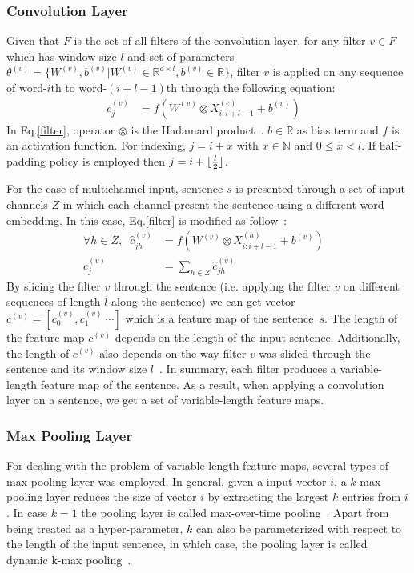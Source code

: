 \subsubsection{Convolution Layer}\label{conv-layer}
Given that \(F\) is the set of all filters of the convolution layer, for any filter \(v \in F\) which has window size \(l\) and set of parameters \(\theta^{(v)} = \{ W^{(v)}, b^{(v)} | W^{(v)} \in \mathbb{R}^{d \times l}, b^{(v)} \in \mathbb{R}\}\), filter \({v}\) is applied on any sequence of word-\(i\)th to word-\((i+l-1)\)th through the following equation:
\begin{align}
c^{(v)}_j &= f(W^{(v)} \otimes X^{(e)}_{i:i+l-1} + b^{(v)}) &\label{filter}
\end{align}
In Eq.\eqref{filter}, operator \(\otimes\) is the Hadamard product~\cite{element-prod}.  
\(b \in \mathbb{R}\) as bias term and \(f\) is an activation function.
For indexing, \(j = i + x\) with \(x \in \mathbb{N}\) and \(0 \leq x < l\).
If half-padding policy is employed then \(j = i + \lfloor \frac{l}{2} \rfloor\).

For the case of multichannel input, sentence \(s\) is presented through a set of input channels \(Z\) in which each channel present the sentence using a different word embedding. 
In this case,
Eq.\eqref{filter} is modified as follow~\cite{KimCNN}:
\begin{align}
\forall h \in Z, \; \; \hat{c}^{(v)}_{jh} &= f(W^{(v)} \otimes X^{(h)}_{i:i+l-1} + b^{(v)})& \\
c^{(v)}_j &= \sum_{h \in Z} \hat{c}^{(v)}_{jh}&
\end{align}
By slicing the filter \(v\) through the sentence (i.e. applying the filter \(v\) on different sequences of length \(l\) along the sentence) we can get vector \(c^{(v)} = [c^{(v)}_0, c^{(v)}_1~\cdots]\) which is a feature map of the sentence~\(s\).
The length of the feature map \(c^{(v)}\) depends on the length of the input sentence.
Additionally, the length of \(c^{(v)}\) also depends on the way filter \(v\) was slided through the sentence and its window size \(l\)~\cite{conv-arith}.
In summary, each filter produces a variable-length feature map of the sentence.
As a result, when applying a convolution layer on a sentence, we get a set of variable-length feature maps.
\subsubsection{Max Pooling Layer}
For dealing with the problem of variable-length feature maps, several types of max pooling layer was employed.
In general, given a input vector \(i\), a \(k\)-max pooling layer reduces the size of vector \(i\) by extracting the largest \(k\) entries from \(i\).
In case \(k = 1\) the pooling layer is called max-over-time pooling~\cite{nlp-scratch,KimCNN}.
Apart from being treated as a hyper-parameter, \(k\) can also be parameterized with respect to the length of the input sentence, in which case, the pooling layer is called dynamic k-max pooling~\cite{DCNN}.

